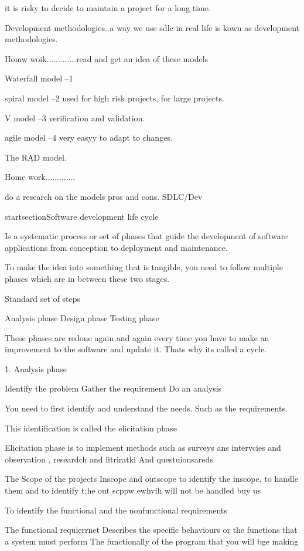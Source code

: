\documentclass[a4paper]{article}
\begin{document}
it is risky to decide to maintain a project for a long time.

Development methodologies.
a way we use sdlc in real life is kown as development methodologies.
  

Homw woik.............read and get an idea of these models 

Waterfall model    --1 

spiral model --2 used for high risk projects, for large projects.

V model --3 verification and validation. 

agile model --4 very easyy to adapt to changes.

The RAD model.

Home work.............



do a research on the models pros and cons. 
SDLC/Dev

startsection{Software development life cycle}

Is a systematic process or set of phases that guide the development of software applications from conception to deployment and maintenance.

To make the idea into something that is tangible, you need to follow multiple phases which are in between these two stages.

Standard set of steps 

Analysis phase  
Design phase  
Testing phase 

These phases are redone again and again every time you have to make an improvement to the software and update it. Thats why its called a cycle.

1. Analysis phase 

Identify the problem  
Gather the requirement   
Do an analysis

You need to first identify and understand the needs. Such as the requirements.

This identification is called the elicitation phase

Elicitation phase is to implement methods such as surveys ans intervcies and observation , researdch and litriratki  
And questuionsareds

The Scope of the projects   
	 Inscope and outscope to identify the inscope, to handle them and to identify t;he out scppw ewhvih will not be handled buy us

To identify the functional and the nonfunctional requirements 

The functional requierrnet   
Describes the specific behaviours or the functions that a system must perform  
The functionally of the program that you will bge making 
\end{document}
